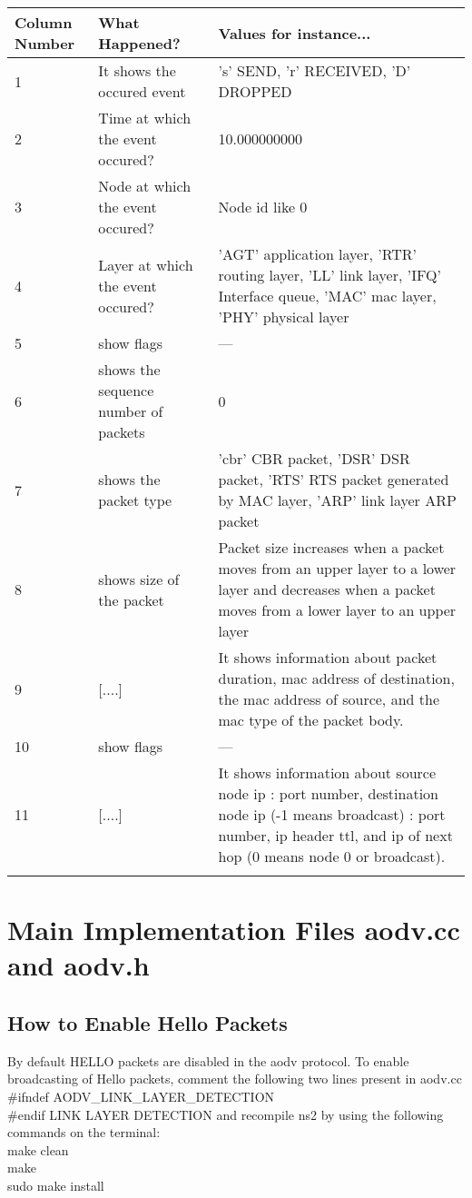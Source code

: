 \documentclass[times,10pt,onecolumn]{article}
\begin{document}
\begin{tabular}{p{1.3cm} | p{3cm} | p{7cm}}
\hline Column Number & What Happened? & Values for instance... \\
\hline
\hline 1 & It shows the occured event & 's' SEND, 'r' RECEIVED, 'D' DROPPED \\ 
\hline 2 & Time at which the event occured? & 10.000000000 \\ 
\hline 3 & Node at which the event occured? & Node id like 0 \\
\hline 4 & Layer at which the event occured? & 'AGT' application layer, 'RTR' routing layer, 'LL' link layer, 'IFQ' Interface queue, 'MAC'  mac layer, 'PHY' physical layer \\
\hline 5 & show flags & --- \\
\hline 6 & shows the sequence number of packets &  0 \\
\hline 7 & shows the packet type & 'cbr' CBR packet, 'DSR' DSR packet, 'RTS' RTS packet generated by MAC layer, 'ARP' link layer ARP packet \\
\hline 8 & shows size of the packet & Packet size increases when a packet moves from an upper layer to a lower layer and decreases when a packet moves from a lower layer to an upper layer \\
\hline 9 & [....] & It shows information about packet duration, mac address of destination, the mac address of source,  and the mac type of the packet body. \\
\hline 10 & show flags & --- \\
\hline 11 & [....] & It shows information about source node ip : port number, destination node ip (-1 means broadcast) : port number, ip header ttl, and  ip of next hop (0 means node 0 or broadcast). \\
\hline  \\
\end{tabular} 



\section{Main Implementation Files aodv.cc and aodv.h}
\label{sec:main}



\subsection{How to Enable Hello Packets}
\label{sec:hello}

By default HELLO packets are disabled in the aodv protocol. To enable broadcasting of Hello packets, comment the following two lines present in aodv.cc\\ \#ifndef AODV\_LINK\_LAYER\_DETECTION\\ \#endif LINK LAYER DETECTION 
and recompile ns2 by using the following commands on the terminal:\\
make clean\\
make \\
sudo make install\\
\end{document}
